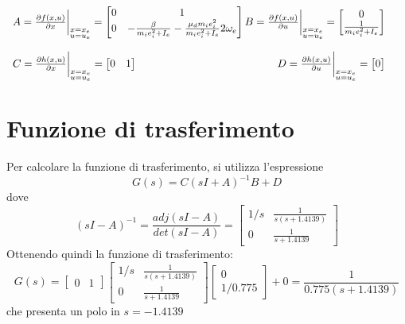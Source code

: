 \documentclass[12pt,italian]{article}
\begin{document}
\begin{equation*}
    \begin{array}{c@{\qquad}c}
    A = \frac{\partial f(x,u)}{\partial x} \bigg|_{\substack{x=x_e\\u=u_e}} =
    \begin{bmatrix} 
        0 & 1 \\ 
        0 & - \frac{\beta}{m_ie_i^2 + I_e} - \frac{\mu_dm_ie_i^2}{m_ie_i^2 + I_e} 2\omega_e 
    \end{bmatrix}
    \hfill B = \frac{\partial f(x,u)}{\partial u} \bigg|_{\substack{x=x_e\\u=u_e}} = 
    \begin{bmatrix} 
        0 \\ 
        \frac{1}{m_ie_i^2 + I_e}
    \end{bmatrix}\\ \\
    C = \frac{\partial h(x,u)}{\partial x} \bigg|_{\substack{x=x_e\\u=u_e}} =
    \begin{bmatrix} 
        0 & 1
    \end{bmatrix}
    \hfill D = \frac{\partial h(x,u)}{\partial u} \bigg|_{\substack{x=x_e\\u=u_e}} =
    \begin{bmatrix} 
        0
    \end{bmatrix}
    \end{array}
\end{equation*}

\newpage

\section{Funzione di trasferimento}

Per calcolare la funzione di trasferimento, si utilizza l'espressione
\begin{equation*}
    G(s) = C(sI + A)^{-1}B + D
\end{equation*}
dove
\begin{equation*}
    (sI - A)^{-1} = \frac{adj(sI - A)}{det(sI - A)} = 
    \begin{bmatrix}
        1/s & \frac{1}{s(s + 1.4139)} \\ 
        0   & \frac{1}{s + 1.4139}
    \end{bmatrix}
\end{equation*}
Ottenendo quindi la funzione di trasferimento:
\begin{equation*}
    G(s) =
    \begin{bmatrix}0 & 1 \end{bmatrix}
    \begin{bmatrix}
        1/s & \frac{1}{s(s+1.4139)} \\
        0 &\frac{1}{s+1.4139} \end{bmatrix}
    \begin{bmatrix}0 \\ 1/0.775 \end{bmatrix}
    + 0 =
    \frac{1}{0.775(s + 1.4139)}
\end{equation*}
che presenta un polo in $s = -1.4139$
\end{document}
